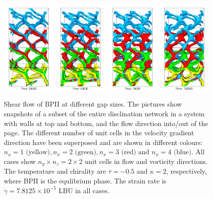 \documentclass[12pt,twoside]{iopart}
\newcommand{\ex}[1]{\times10^{#1}}
\begin{document}
\begin{figure}[t]
\includegraphics[width=0.24\textwidth]{bp2_t-0o5_k2_25k_y.png}
\includegraphics[width=0.24\textwidth]{bp2_t-0o5_k2_50k_y.png}
\includegraphics[width=0.24\textwidth]{bp2_t-0o5_k2_75k_y.png}
\includegraphics[width=0.24\textwidth]{bp2_t-0o5_k2_100k_y.png}
\caption{Shear flow of BPII at different gap sizes. The pictures show
snapshots of a subset of the entire disclination network in a system
with walls at top and bottom, and the flow direction into/out of the
page. The different number of unit cells in the velocity gradient
direction have been superposed and are shown in different colours:
$n_x=1 \mbox{ (yellow)}, n_x=2 \mbox{ (green)}, n_x=3 \mbox{ (red) and }
n_x=4 \mbox{ (blue)}$. All cases show $n_y \times n_z =2 \times 2$ unit
cells in flow and vorticity directions. The temperature and chirality are
$\tau=-0.5$ and $\kappa=2$, respectively, where BPII is the equlibrium phase.
The strain rate is $\dot{\gamma}=7.8125\ex{-5}$ LBU in all cases.}
\label{fig1}
\end{figure}
\end{document}
